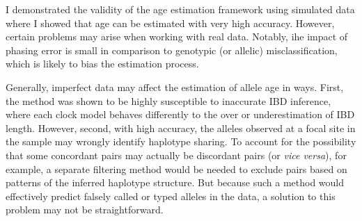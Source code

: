 I demonstrated the validity of the age estimation framework using simulated data where I showed that age can be estimated with very high accuracy.
However, certain problems may arise when working with real data.
Notably, ihe impact of phasing error is small in comparison to genotypic (or allelic) misclassification, which is likely to bias the estimation process.

Generally, imperfect data may affect the estimation of allele age in  ways.
First, the method was shown to be highly susceptible to inaccurate IBD inference, where each clock model behaves differently to the over or underestimation of IBD length.
However, second,  with high accuracy, the alleles observed at a focal site in the sample may wrongly identify haplotype sharing.
To account for the possibility that some concordant pairs may actually be discordant pairs (or \emph{vice versa}), for example, a separate filtering method would be needed to exclude pairs based on patterns of the inferred haplotype structure.
But because such a method would effectively predict falsely called or typed alleles in the data, a solution to this problem may not be straightforward.




